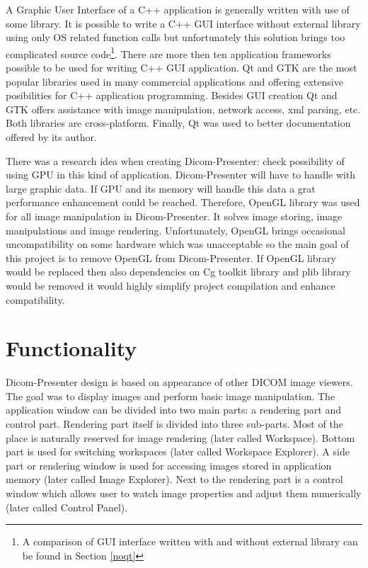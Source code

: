 A Graphic User Interface of a C++ application is generally written with use of some library. It is possible to write a C++ GUI interface without external library using only OS related function calls but unfortunately this solution brings too complicated source code\footnote{A comparison of GUI interface written with and without external library can be found in Section \ref{noqt}}. There are more then ten application frameworks possible to be used for writing C++ GUI application. Qt and GTK are the most popular libraries used in many commercial applications and offering extensive posibilities for C++ application programming. Besides GUI creation Qt and GTK offers assistance with image manipulation, network access, xml parsing, etc. Both libraries are cross-platform. Finally, Qt was used to better documentation offered by its author.

There was a research idea when creating Dicom-Presenter: check possibility of using GPU in this kind of application. Dicom-Presenter will have to handle with large graphic data. If GPU and its memory will handle this data a grat performance enhancement could be reached. Therefore, OpenGL library was used for all image manipulation in Dicom-Presenter. It solves image storing, image manipulations and image rendering. Unfortunately, OpenGL brings 
occasional uncompatibility on some hardware which was unacceptable so the main goal of this project is to remove OpenGL from Dicom-Presenter. If OpenGL library would be replaced then also dependencies on Cg toolkit library and plib library would be removed it would highly simplify project compilation and enhance compatibility.


\section{Functionality}
Dicom-Presenter design is based on appearance of other DICOM image viewers. The goal was to display images and perform basic image manipulation. The application window can be divided into two main parts: a rendering part and control part. Rendering part itself is divided into three sub-parts. Most of the place is naturally reserved for image rendering (later called Workspace). Bottom part is used for switching workspaces (later called Workspace Explorer). A side part or rendering window is used for accessing images stored in application memory (later called Image Explorer). Next to the rendering part is a control window which allows user to watch image  properties and adjust them numerically (later called Control Panel). 


